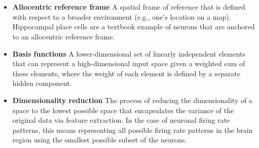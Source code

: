 
\section*{}
\label{sec:Glossary}


\begin{itemize}
\item \textbf{Allocentric reference frame} A spatial frame of reference that is defined with respect to a broader environment (e.g., one's location on a map). Hippocampal place cells are a textbook example of neurons that are anchored to an allocentric reference frame.

\item \textbf{Basis functions} A lower-dimensional set of linearly independent elements that can represent a high-dimensional input space given a weighted sum of these elements, where the weight of each element is defined by a separate hidden component.



\item \textbf{Dimensionality reduction} The process of reducing the dimensionality of a space to the lowest possible space that encapsulates the variance of the original data via feature extraction. In the case of neuronal firing rate patterns, this means representing all possible firing rate patterns in the brain region using the smallest possible subset of the neurons.


\end{itemize}
